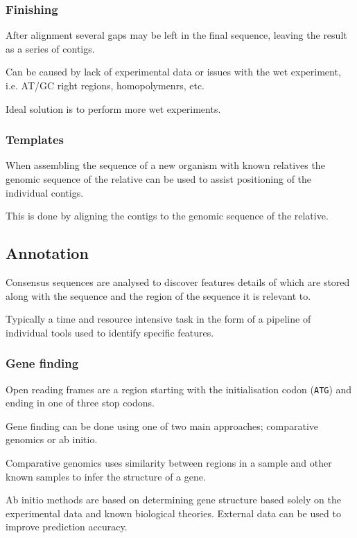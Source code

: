 \documentclass[a4paper]{article}
\begin{document}
\subsubsection{Finishing}

After alignment several gaps may be left in the final sequence, leaving the
result as a series of contigs.

Can be caused by lack of experimental data or issues with the wet experiment,
i.e. AT/GC right regions, homopolymenrs, etc.

Ideal solution is to perform more wet experiments.

\subsubsection{Templates}

When assembling the sequence of a new organism with known relatives the genomic
sequence of the relative can be used to assist positioning of the individual
contigs.

This is done by aligning the contigs to the genomic sequence of the relative.

\subsection{Annotation}

Consensus sequences are analysed to discover features details of which are
stored along with the sequence and the region of the sequence it is relevant to.

Typically a time and resource intensive task in the form of a pipeline of
individual tools used to identify specific features.

\subsubsection{Gene finding}

Open reading frames are a region starting with the initialisation codon
(\texttt{ATG}) and ending in one of three stop codons.

Gene finding can be done using one of two main approaches; comparative genomics
or ab initio.

Comparative genomics uses similarity between regions in a sample and other known
samples to infer the structure of a gene.

Ab initio methods are based on determining gene structure based solely on the
experimental data and known biological theories. External data can be used to
improve prediction accuracy.
\end{document}
